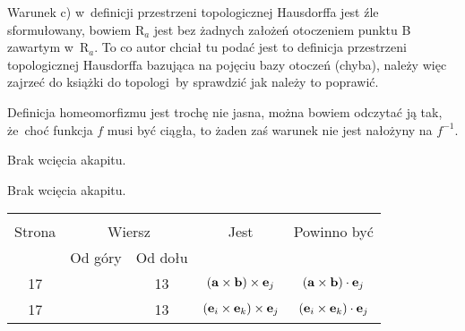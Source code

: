 \documentclass[a4paper,11pt]{article}
\begin{document}
\vspace{\spaceTwo}














 Warunek c) w~definicji przestrzeni topologicznej Hausdorffa jest źle sformułowany, bowiem $\mathrm{R}_{ a }$ jest bez żadnych założeń otoczeniem punktu B zawartym w~$\mathrm{R}_{ a }$. To co autor chciał tu podać jest to definicja przestrzeni topologicznej Hausdorffa bazująca na pojęciu bazy otoczeń (chyba), należy więc zajrzeć do książki do topologi~by sprawdzić jak należy to poprawić.

\vspace{\spaceFour}



Definicja homeomorfizmu jest trochę nie jasna, można bowiem odczytać ją tak, że~choć funkcja $f$ musi być ciągła, to żaden zaś warunek nie jest nałożyny na $f^{ -1 }$.

\vspace{\spaceFour}



 Brak wcięcia akapitu.

\vspace{\spaceFour}



 Brak wcięcia akapitu.

\vspace{\spaceFour}






\begin{center}

  \begin{tabular}{|c|c|c|c|c|}
    \hline
    & \multicolumn{2}{c|}{} & & \\
    Strona & \multicolumn{2}{c|}{Wiersz} & Jest
                              & Powinno być \\ \cline{2-3}
    & Od góry & Od dołu &  &  \\ \hline
    17 & & 13 & $( \mathbf{a} \times \mathbf{b} ) \times \mathbf{e}_{ j }$
           & $( \mathbf{a} \times \mathbf{b} ) \cdot \mathbf{e}_{ j }$ \\
    17 & & 13 & $( \mathbf{e}_{ i } \times \mathbf{e}_{ k } ) \times \mathbf{e}_{ j }$
           & $( \mathbf{e}_{ i } \times \mathbf{e}_{ k } ) \cdot \mathbf{e}_{ j }$ \\
    \hline
  \end{tabular}

\end{center}
\end{document}
